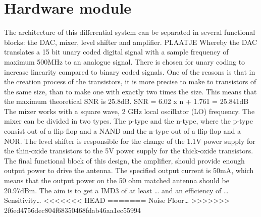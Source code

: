 \section{Hardware module}\label{sec:overview}
The architecture of this differential system can be separated in several functional blocks: the DAC, mixer, level shifter and amplifier.
PLAATJE
Whereby the DAC translates a 15 bit unary coded digital signal with a sample frequency of maximum 500MHz to an analogue signal. There is chosen for unary coding to increase linearity compared to binary coded signals. One of the reasons is that in the creation process of the transistors, it is more precise to make to transistors of the same size, than to make one with exactly two times the size. This means that the maximum theoretical SNR is 25.8dB.
SNR = 6.02 x n + 1.761 = 25.841dB 
The mixer works with a square wave, 2 GHz local oscillator (LO) frequency. The mixer can be divided in two types. The p-type and the n-type, where the p-type consist out of a flip-flop and a NAND and the n-type out of a flip-flop and a NOR.
The level shifter is responsible for the change of the 1.1V power supply for the thin-oxide transistors to the 5V power supply for the thick-oxide transistors.
The final functional block of this design, the amplifier, should provide enough output power to drive the antenna. The specified output current is 50mA, which means that the output power on the 50 ohm matched antenna should be 20.97dBm.
The aim is to get a IMD3 of at least … and an efficiency of … 
Sensitivity…
<<<<<<< HEAD
=======
Noise Floor…
>>>>>>> 2f6ed4756dec804f68350468fdab46aa1ec55994
